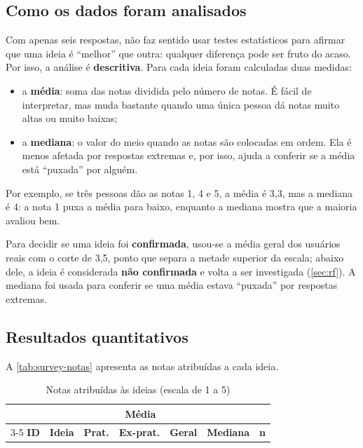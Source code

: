\subsection{Como os dados foram analisados}

Com apenas seis respostas, não faz sentido usar testes estatísticos para
afirmar que uma ideia é ``melhor'' que outra: qualquer diferença pode ser
fruto do acaso. Por isso, a análise é \textbf{descritiva}. Para cada
ideia foram calculadas duas medidas:

\begin{itemize}
  \item a \textbf{média}: soma das notas dividida pelo número de notas. É
        fácil de interpretar, mas muda bastante quando uma única pessoa
        dá notas muito altas ou muito baixas;
  \item a \textbf{mediana}: o valor do meio quando as notas são
        colocadas em ordem. Ela é menos afetada por respostas extremas e,
        por isso, ajuda a conferir se a média está ``puxada'' por alguém.
\end{itemize}

Por exemplo, se três pessoas dão as notas 1, 4 e 5, a média é 3,3, mas a
mediana é 4: a nota 1 puxa a média para baixo, enquanto a mediana mostra
que a maioria avaliou bem.

Para decidir se uma ideia foi \textbf{confirmada}, usou-se a média geral
dos usuários reais com o corte de 3,5, ponto que separa a metade
superior da escala; abaixo dele, a ideia é considerada \textbf{não
confirmada} e volta a ser investigada (\autoref{sec:rf}). A mediana foi
usada para conferir se uma média estava ``puxada'' por respostas
extremas.

\subsection{Resultados quantitativos}

A \autoref{tab:survey-notas} apresenta as notas atribuídas a cada ideia.

\begin{table}[H]
  \centering
  \caption{Notas atribuídas às ideias (escala de 1 a 5)}
  \label{tab:survey-notas}
  \footnotesize
  \begin{tabular}{clccccc}
    \toprule
    & & \multicolumn{3}{c}{\textbf{Média}} & & \\
    \cmidrule(lr){3-5}
    \textbf{ID} & \textbf{Ideia} & \textbf{Prat.} & \textbf{Ex-prat.} & \textbf{Geral} & \textbf{Mediana} & \textbf{n} \\
    \midrule
  \end{tabular}
\end{table}


